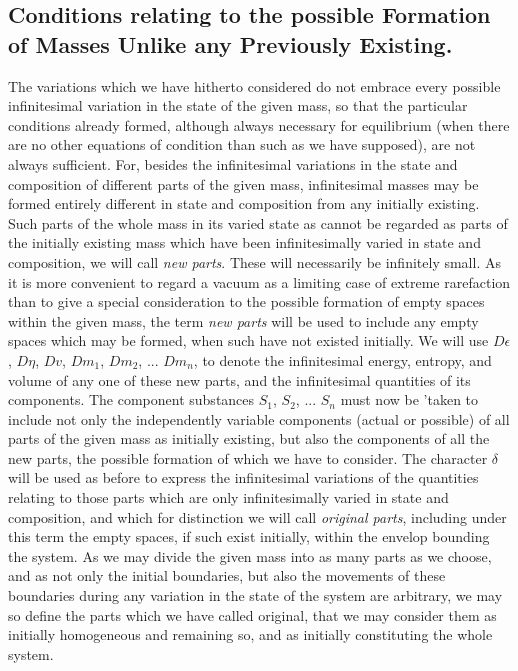 \documentclass[12pt]{article}
\begin{document}
\subsection{Conditions relating to the possible Formation of Masses Unlike any Previously Existing.}
The variations which we have hitherto considered do not embrace every possible infinitesimal variation in the state of the given mass, so that the particular conditions already formed, although always necessary for equilibrium (when there are no other equations of condition than such as we have supposed), are not always sufficient. For, besides the infinitesimal variations in the state and composition of different parts of the given mass, infinitesimal masses may be formed entirely different in state and composition from any initially existing. Such parts of the whole mass in its varied state as cannot be regarded as parts of the initially existing mass which have been infinitesimally varied in state and composition, we will call \textit{new parts}. These will necessarily be infinitely small. As it is more convenient to regard a vacuum as a limiting case of extreme rarefaction than to give a special consideration to the possible formation of empty spaces within the given mass, the term \textit{new parts} will be used to include any empty spaces which may be formed, when such have not existed initially. We will use $D\epsilon$, $D\eta$, $Dv$, $Dm_1$, $Dm_2$, ... $Dm_n$, to denote the infinitesimal energy, entropy, and volume of any one of these new parts, and the infinitesimal quantities of its components. The component substances $S_1$, $S_2$, ... $S_n$ must now be 'taken to include not only the independently variable components (actual or possible) of all parts of the given mass as initially existing, but also the components of all the new parts, the possible formation of which we have to consider. The character $\delta$ will be used as before to express the infinitesimal variations of the quantities relating to those parts which are only infinitesimally varied in state and composition, and which for distinction we will call \textit{original parts}, including under this term the empty spaces, if such exist initially, within the envelop bounding the system. As we may divide the given mass into as many parts as we choose, and as not only the initial boundaries, but also the movements of these boundaries during any variation in the state of the system are arbitrary, we may so define the parts which we have called original, that we may consider them as initially homogeneous and remaining so, and as initially constituting the whole system.
\end{document}
